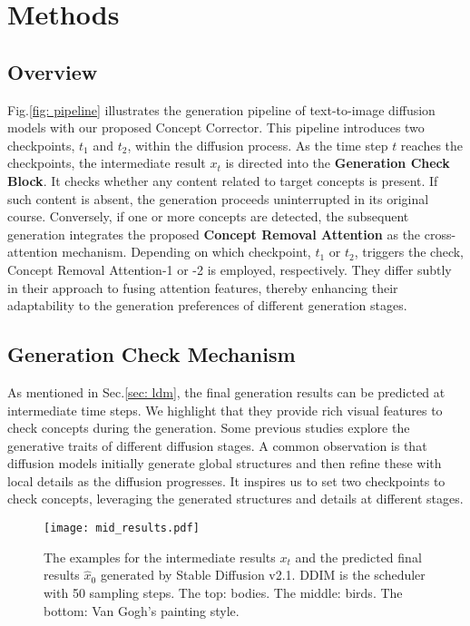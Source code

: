 \section{Methods}
\label{sec: methods}

\subsection{Overview}
Fig.\ref{fig: pipeline} illustrates the generation pipeline of text-to-image diffusion models with our proposed Concept Corrector. This pipeline introduces two checkpoints, $t_1$ and $t_2$, within the diffusion process. As the time step $t$ reaches the checkpoints, the intermediate result $x_t$ is directed into the \textbf{Generation Check Block}. It checks whether any content related to target concepts is present. If such content is absent, the generation proceeds uninterrupted in its original course. Conversely, if one or more concepts are detected, the subsequent generation integrates the proposed \textbf{Concept Removal Attention} as the cross-attention mechanism. Depending on which checkpoint, $t_1$ or $t_2$, triggers the check, Concept Removal Attention-1 or -2 is employed, respectively. They differ subtly in their approach to fusing attention features, thereby enhancing their adaptability to the generation preferences of different generation stages.


\subsection{Generation Check Mechanism}
\label{sec: generation check mechanism}

As mentioned in Sec.\ref{sec: ldm}, the final generation results can be predicted at intermediate time steps. We highlight that they provide rich visual features to check concepts during the generation. Some previous studies \cite{choi2022perception, jung2024latent} explore the generative traits of different diffusion stages. A common observation is that diffusion models initially generate global structures and then refine these with local details as the diffusion progresses. It inspires us to set two checkpoints to check concepts, leveraging the generated structures and details at different stages.

\begin{figure}[t]
    \centering
    \texttt{[image: mid\_results.pdf]}
    \caption{The examples for the intermediate results $x_t$ and the predicted final results $\hat{x}_0$ generated by Stable Diffusion v2.1. DDIM \cite{songdenoising} is the scheduler with 50 sampling steps. The top: bodies. The middle: birds. The bottom: Van Gogh's painting style.}
    \label{fig: mid results}
\end{figure}

